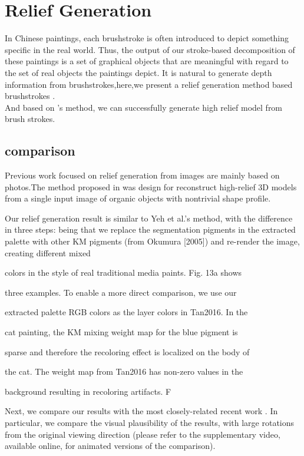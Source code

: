 
\section{ Relief Generation}

In Chinese paintings, each brushstroke is often introduced to depict something specific in the real world.
Thus, the output of our stroke-based decomposition of these paintings is a set of graphical objects that are meaningful with regard to the set of real objects the paintings depict. It is natural to generate depth information from brushstrokes,here,we present a relief generation method based brushstrokes  \cite{xu2006animating} . \\
And based on \cite{yeh2017interactive}'s method, we can successfully generate high relief model from brush strokes. 

\subsection{comparison}

Previous work focused on relief generation from images are mainly based on photos.The method proposed in \cite{yeh2017interactive} was design for reconstruct high-relief 3D models from a single input image of organic objects with nontrivial shape profile. 

Our relief generation result is similar to Yeh et al.’s method, with the difference in three steps:  being that we replace the segmentation 
pigments in the extracted palette with other KM pigments (from
Okumura [2005]) and re-render the image, creating different mixed

colors in the style of real traditional media paints. Fig. 13a shows

three examples. To enable a more direct comparison, we use our

extracted palette RGB colors as the layer colors in Tan2016. In the

cat painting, the KM mixing weight map for the blue pigment is

sparse and therefore the recoloring effect is localized on the body of

the cat. The weight map from Tan2016 has non-zero values in the

background resulting in recoloring artifacts. F



Next, we compare our results with the most closely-related recent work \cite{yeh2017interactive}. In particular, we compare the visual plausibility of the results, with large rotations from the original viewing direction (please refer to the supplementary video, available online, for animated versions of the comparison). 
   
